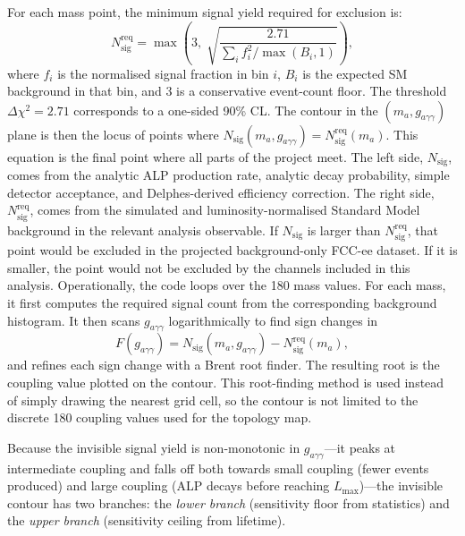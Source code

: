 \documentclass[12pt,a4paper]{article}
\newcommand{\alp}{a}
\newcommand{\gagg}{g_{a\gamma\gamma}}
\newcommand{\ma}{m_a}
\newcommand{\dchi}{\Delta\chi^2}
\begin{document}
For each mass point, the minimum signal yield required for exclusion is:
\begin{equation}
    N_\mathrm{sig}^\mathrm{req} =
    \max\!\left(3,\;
    \sqrt{\frac{2.71}{\displaystyle\sum_i f_i^2 / \max(B_i, 1)}}
    \right),
    \label{eq:nsig_req}
\end{equation}
where $f_i$ is the normalised signal fraction in bin $i$, $B_i$ is the expected
SM background in that bin, and 3 is a conservative event-count floor.
The threshold $\dchi = 2.71$ corresponds to a one-sided 90\% CL.
The contour in the $(m_\alp, \gagg)$ plane is then the locus of points where
$N_\mathrm{sig}(\ma, \gagg) = N_\mathrm{sig}^\mathrm{req}(\ma)$.
This equation is the final point where all parts of the project meet. The left
side, $N_\mathrm{sig}$, comes from the analytic ALP production rate, analytic
decay probability, simple detector acceptance, and Delphes-derived efficiency
correction. The right side, $N_\mathrm{sig}^\mathrm{req}$, comes from the
simulated and luminosity-normalised Standard Model background in the relevant
analysis observable. If $N_\mathrm{sig}$ is larger than
$N_\mathrm{sig}^\mathrm{req}$, that point would be excluded in the projected
background-only FCC-ee dataset. If it is smaller, the point would not be
excluded by the channels included in this analysis.
Operationally, the code loops over the 180 mass values. For each mass, it first
computes the required signal count from the corresponding background histogram.
It then scans $\gagg$ logarithmically to find sign changes in
\begin{equation}
    F(\gagg)
    =
    N_\mathrm{sig}(\ma,\gagg)
    -
    N_\mathrm{sig}^\mathrm{req}(\ma),
    \label{eq:root_function}
\end{equation}
and refines each sign change with a Brent root finder. The resulting root is
the coupling value plotted on the contour. This root-finding method is used
instead of simply drawing the nearest grid cell, so the contour is not limited
to the discrete 180 coupling values used for the topology map.

Because the invisible signal yield is non-monotonic in $\gagg$---it peaks at
intermediate coupling and falls off both towards small coupling (fewer events
produced) and large coupling (ALP decays before reaching $L_\mathrm{max}$)---the
invisible contour has two branches:
the \emph{lower branch} (sensitivity floor from statistics) and the
\emph{upper branch} (sensitivity ceiling from lifetime).

\end{document}
